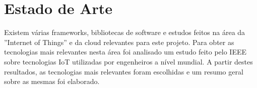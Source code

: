 \chapter{Estado de Arte}

Existem várias frameworks, bibliotecas de software e estudos feitos na área da ''Internet of Things'' e da cloud relevantes para este projeto. Para obter as tecnologias mais relevantes nesta área foi analisado um estudo \cite{ieeesurvey} feito pelo IEEE sobre tecnologias IoT utilizadas por engenheiros a nível mundial. A partir destes resultados, as tecnologias mais relevantes foram escolhidas e um resumo geral sobre as mesmas foi elaborado.



